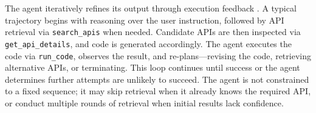 The agent iteratively refines its output through execution feedback \cite{cline2024cline}. A typical trajectory begins with reasoning over the user instruction, followed by API retrieval via \texttt{search\_apis} when needed. Candidate APIs are then inspected via \texttt{get\_api\_details}, and code is generated accordingly. The agent executes the code via \texttt{run\_code}, observes the result, and re-plans—revising the code, retrieving alternative APIs, or terminating. This loop continues until success or the agent determines further attempts are unlikely to succeed. The agent is not constrained to a fixed sequence; it may skip retrieval when it already knows the required API, or conduct multiple rounds of retrieval when initial results lack confidence.
